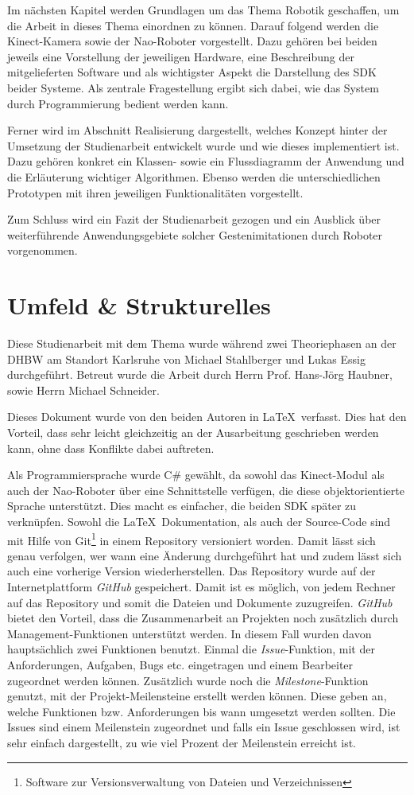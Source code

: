 Im nächsten Kapitel werden Grundlagen um das Thema Robotik geschaffen, um die Arbeit in dieses Thema einordnen zu können. Darauf folgend werden die Kinect-Kamera sowie der Nao-Roboter vorgestellt. Dazu gehören bei beiden jeweils eine Vorstellung der jeweiligen Hardware, eine Beschreibung der mitgelieferten Software und als wichtigster Aspekt die Darstellung des \ac{SDK} beider Systeme. Als zentrale Fragestellung ergibt sich dabei, wie das System durch Programmierung bedient werden kann.

Ferner wird im Abschnitt Realisierung dargestellt, welches Konzept hinter der Umsetzung der Studienarbeit entwickelt wurde und wie dieses implementiert ist. Dazu gehören konkret ein Klassen- sowie ein Flussdiagramm der Anwendung und die Erläuterung wichtiger Algorithmen. Ebenso werden die unterschiedlichen Prototypen mit ihren jeweiligen Funktionalitäten vorgestellt. 

Zum Schluss wird ein Fazit der Studienarbeit gezogen und ein Ausblick über weiterführende Anwendungsgebiete solcher Gestenimitationen durch Roboter vorgenommen.

\section{Umfeld \& Strukturelles}
Diese Studienarbeit mit dem Thema \textit{\Titel} wurde während zwei Theoriephasen an der \ac{DHBW} am Standort Karlsruhe von Michael Stahlberger und Lukas Essig durchgeführt. Betreut wurde die Arbeit durch Herrn Prof. Hans-Jörg Haubner, sowie Herrn Michael Schneider. 

Dieses Dokument wurde von den beiden Autoren in \LaTeX\ verfasst. Dies hat den Vorteil, dass sehr leicht gleichzeitig an der Ausarbeitung geschrieben werden kann, ohne dass Konflikte dabei auftreten. 

Als Programmiersprache wurde C\# gewählt, da sowohl das Kinect-Modul als auch der Nao-Roboter über eine Schnittstelle verfügen, die diese objektorientierte Sprache unterstützt. Dies macht es einfacher, die beiden \ac{SDK} später zu verknüpfen.
\noindent
Sowohl die \LaTeX\ Dokumentation, als auch der Source-Code sind mit Hilfe von Git\footnote{Software zur Versionsverwaltung von Dateien und Verzeichnissen}  in einem Repository versioniert worden. Damit lässt sich genau verfolgen, wer wann eine Änderung durchgeführt hat und zudem lässt sich auch eine vorherige Version wiederherstellen.
Das Repository wurde auf der Internetplattform \textit{GitHub} gespeichert. Damit ist es möglich, von jedem Rechner auf das Repository und somit die Dateien und Dokumente zuzugreifen. \textit{GitHub} bietet den Vorteil, dass die Zusammenarbeit an Projekten noch zusätzlich durch Management-Funktionen unterstützt werden. In diesem Fall wurden davon hauptsächlich zwei Funktionen benutzt. Einmal die \textit{Issue}-Funktion, mit der Anforderungen, Aufgaben, Bugs etc. eingetragen und einem Bearbeiter zugeordnet werden können. Zusätzlich wurde noch die \textit{Milestone}-Funktion genutzt, mit der Projekt-Meilensteine erstellt werden können. Diese geben an, welche Funktionen bzw. Anforderungen bis wann umgesetzt werden sollten. Die Issues sind einem Meilenstein zugeordnet und falls ein Issue geschlossen wird, ist sehr einfach dargestellt, zu wie viel Prozent der Meilenstein erreicht ist.
